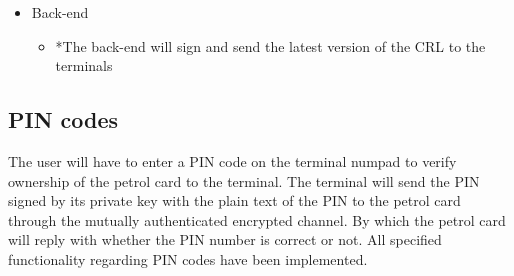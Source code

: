 \begin{itemize}







\item Back-end
\begin{itemize}
\item *The back-end will sign and send the latest version of the CRL to the terminals
\end{itemize}
\end{itemize}

\subsection{PIN codes}
The user will have to enter a PIN code on the terminal numpad to verify ownership of the petrol card to the terminal. The terminal will send the PIN signed by its private key with the plain text of the PIN to the petrol card through the mutually authenticated encrypted channel. By which the petrol card will reply with whether the PIN number is correct or not. All specified functionality regarding PIN codes have been implemented. 

